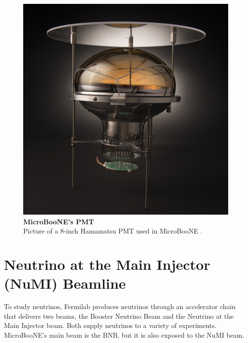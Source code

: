 \begin{figure}[h!]
    \begin{center}
        \includegraphics[scale=0.2]{Figures/microboone_pmt.jpeg}
        \caption[MicroBooNE's PMT]{{\textbf{MicroBooNE's PMT}} \\Picture of a $8$-inch Hamamatsu PMT used in MicroBooNE \cite{uboone_pmt}.}
        \label{uboone_pmt} 
    \end{center}
\end{figure}

\section{Neutrino at the Main Injector (NuMI) Beamline}

To study neutrinos, Fermilab produces neutrinos through an accelerator chain that delivers two beams, the Booster Neutrino Beam and the Neutrino at the Main Injector beam. Both supply neutrinos to a variety of experiments. MicroBooNE's main beam is the BNB,  but it is also exposed to the NuMI beam. 

